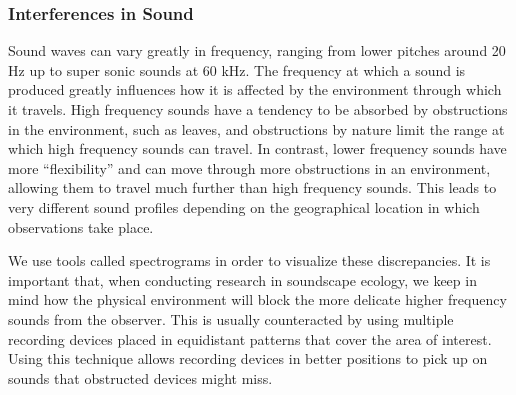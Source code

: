 \subsubsection{Interferences in Sound}
Sound waves can vary greatly in frequency, ranging from lower pitches around 20 Hz up to super sonic sounds at 60 kHz. The frequency at which a sound is produced greatly influences how it is affected by the environment through which it travels. High frequency sounds have a tendency to be absorbed by obstructions in the environment, such as leaves, and obstructions by nature limit the range at which high frequency sounds can travel. In contrast, lower frequency sounds have more ``flexibility'' and can move through more obstructions in an environment, allowing them to travel much further than high frequency sounds. This leads to very different sound profiles depending on the geographical location in which observations take place.\par
We use tools called spectrograms in order to visualize these discrepancies. It is important that, when conducting research in soundscape ecology, we keep in mind how the physical environment will block the more delicate higher frequency sounds from the observer. This is usually counteracted by using multiple recording devices placed in equidistant patterns that cover the area of interest. Using this technique allows recording devices in better positions to pick up on sounds that obstructed devices might miss.

